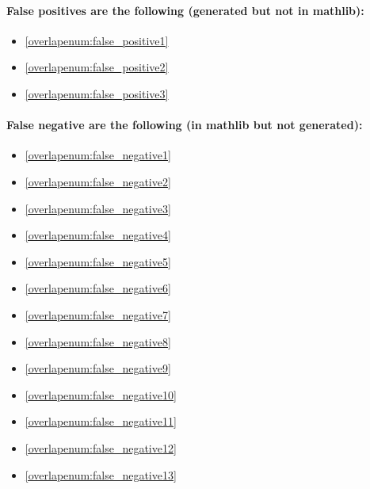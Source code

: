 \paragraph*{False positives are the following (generated but not in mathlib):}

\begin{multicols}{2}
\begin{itemize}[noitemsep]
    \item \cref{overlapenum:false_positive1}
    \item \cref{overlapenum:false_positive2}
    \item \cref{overlapenum:false_positive3}
\end{itemize}
\end{multicols}
\vspace{-0.2cm}

\paragraph*{False negative are the following (in mathlib but not generated):}

\begin{multicols}{2}
\begin{itemize}[noitemsep]
    \item \cref{overlapenum:false_negative1}
    \item \cref{overlapenum:false_negative2}
    \item \cref{overlapenum:false_negative3}
    \item \cref{overlapenum:false_negative4}
    \item \cref{overlapenum:false_negative5}
    \item \cref{overlapenum:false_negative6}
    \item \cref{overlapenum:false_negative7}
    \item \cref{overlapenum:false_negative8}
    \item \cref{overlapenum:false_negative9}
    \item \cref{overlapenum:false_negative10}
    \item \cref{overlapenum:false_negative11}
    \item \cref{overlapenum:false_negative12}
    \item \cref{overlapenum:false_negative13}
\end{itemize}
\end{multicols}
\vspace{-0.2cm}

